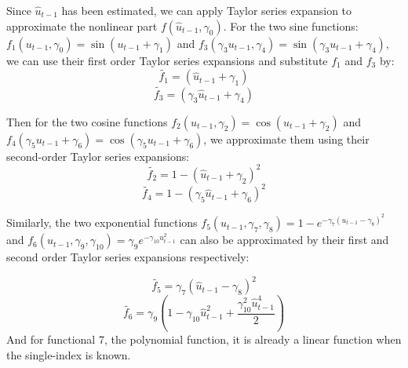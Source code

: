 \documentclass[a4paper,12pt,times,numbered,print,index]{report}
\numberwithin{equation}{section}
\begin{document}

Since $\hat{u}_{t-1}$ has been estimated, we can apply Taylor series expansion to approximate the nonlinear part $f\left( \hat{u}_{t-1},\gamma _{0}\right)$. For the two sine functions: $f_{1}\left( u_{t-1},\gamma _{0}\right) =\sin \left( u_{t-1}+\gamma_{1}\right)$ and $f_{3}\left( \gamma_{3}u_{t-1},\gamma _{4}\right) =\sin \left( \gamma_{3}u_{t-1}+\gamma_{4}\right)$, we can use their first order Taylor series expansions and substitute $f_1$ and $f_3$ by: 
$$
\tilde{f_1} = \left( \hat{u}_{t-1}+\gamma_{1}\right) 
$$ 
$$
\tilde{f_3} = \left( \gamma_{3}\hat{u}_{t-1}+\gamma_{4}\right) 
$$ 

Then for the two cosine functions $f_{2}\left( u_{t-1},\gamma _{2}\right) =\cos \left(u_{t-1}+\gamma_{2}\right)$ and $f_{4}\left( \gamma _{5}u_{t-1}+\gamma_{6}\right) =\cos \left( \gamma_{5}u_{t-1}+\gamma_{6}\right)$, we approximate them using their second-order Taylor series expansions:
$$
\tilde{f_2} = 1 - \left( \hat{u}_{t-1}+\gamma_{2}\right)^2
$$ 
$$
\tilde{f_4} =  1 - \left(\gamma _{5} \hat{u}_{t-1}+\gamma_{6}\right)^2
$$ 

Similarly, the two exponential functions $f_{5}\left( u_{t-1}, \gamma_{7}, \gamma_{8}\right) = 1-e^{-\gamma_{7}\left(u_{t-1}-\gamma_{8}\right)^{2}}$ and $f_{6}\left( u_{t-1},\gamma _{9}, \gamma_{10}\right) = \gamma_{9} e^{-\gamma_{10}u_{t-1}^2}$ can also be approximated by their first and second order Taylor series expansions respectively:

$$
\tilde{f_5} = \gamma_{7}(\hat{u}_{t-1} - \gamma_{8})^2
$$
$$
\tilde{f_6}= \gamma_{9}(1-\gamma_{10}\hat{u}_{t-1}^2 + \dfrac{\gamma_{10}^2 \hat{u}_{t-1}^4}{2})
$$
And for functional 7, the polynomial function, it is already a linear function when the single-index is known. 
\end{document}
